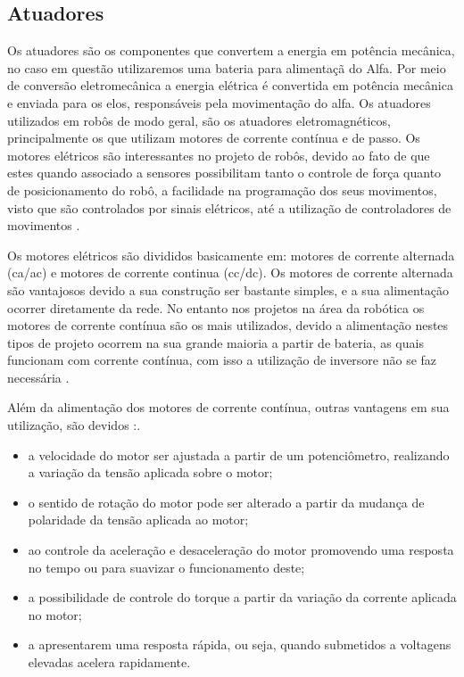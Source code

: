 \subsection{Atuadores}

Os atuadores são os componentes que convertem a energia em potência mecânica, no caso em questão utilizaremos uma bateria para alimentaçã
 do Alfa. Por meio de conversão eletromecânica a energia elétrica é convertida em potência mecânica e enviada para os elos, responsáveis
 pela movimentação do alfa.  Os atuadores utilizados em robôs de modo geral, são os atuadores eletromagnéticos, principalmente os que
 utilizam motores de corrente contínua e de passo. Os motores elétricos são interessantes no projeto de robôs, devido ao fato de que estes
 quando associado a sensores possibilitam tanto o controle de força quanto de posicionamento do robô, a facilidade na programação dos seus
 movimentos, visto que são controlados por sinais elétricos, até a utilização de controladores de movimentos \cite{romano:2002}.

Os motores elétricos são divididos basicamente em: motores de corrente alternada (ca/ac) e motores de corrente continua (cc/dc). Os motores
de corrente alternada são vantajosos devido a sua construção ser bastante simples, e a sua alimentação ocorrer diretamente da rede. No
entanto nos projetos na área da robótica os motores de corrente contínua são os mais utilizados, devido a alimentação nestes tipos de
projeto ocorrem na sua grande maioria a partir de bateria, as quais funcionam com corrente contínua, com isso a utilização de inversore
não se faz necessária \cite{braga:2006}.


Além da alimentação dos motores de corrente contínua, outras vantagens em sua utilização, são devidos \cite{braga:2006}:.
\begin{itemize}
	\item a velocidade do motor ser ajustada a partir de um potenciômetro, realizando a variação da tensão aplicada sobre o motor;
	\item o sentido de rotação do motor pode ser alterado a partir da mudança de polaridade da tensão aplicada ao motor;
	\item ao controle da aceleração e desaceleração do motor promovendo uma resposta no tempo ou para suavizar o funcionamento deste;
	\item a possibilidade de controle do torque a partir da variação da corrente aplicada no motor;
	\item a apresentarem uma resposta rápida, ou seja, quando submetidos a voltagens elevadas acelera rapidamente.
\end{itemize}


